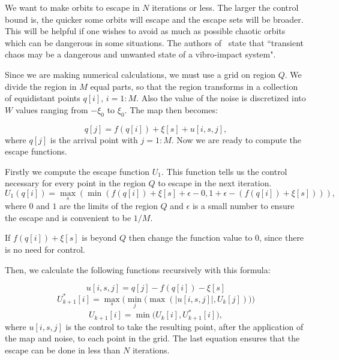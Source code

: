 We want to make orbits to escape in $N$ iterations or less. The larger the control bound is, the quicker some orbits will escape and the escape sets will be broader. This will be helpful if one wishes to avoid as much as possible chaotic orbits which can be dangerous in some situations. The authors of~\cite{AvoidTransient1} state that ``transient chaos may be a dangerous and unwanted state of a vibro-impact system". 

Since we are making numerical calculations, we must use a grid on region $Q$. We divide the region in $M$ equal parts, so that the region transforms in a collection of equidistant points $q[i]$, $i=1:M$. Also the value of the noise is discretized into $W$ values ranging from $-\xi_0$ to $\xi_0$. The map then becomes:

\begin{equation}
    q[j] = f(q[i]) +\xi[s] +u[i,s,j],
\end{equation}
where $q[j]$ is the arrival point with $j=1:M$. Now we are ready to compute the escape functions.

Firstly we compute the escape function $U_1$. This function tells us the control necessary for every point in the region $Q$ to escape in the next iteration. 
\begin{equation}
U_1(q[i]) = \max\limits_{s}(\min(f(q[i]) + \xi[s] + \epsilon - 0, 1 + \epsilon - (f(q[i]) + \xi[s]))),
\end{equation}
where $0$ and $1$ are the limits of the region $Q$ and $\epsilon$ is a small number to ensure the escape and is convenient to be $1/M$.

If $f(q[i]) + \xi[s]$ is beyond $Q$ then change the function value to $0$, since there is no need for control.

Then, we calculate the following functions recursively with this formula:

\begin{equation*}
u[i,s,j] = q[j] - f(q[i]) - \xi[s]
\end{equation*}
\begin{equation*}
U^{*}_{k+1}[i]=\max_s\Big(\min_j\big(\max(|u[i,s,j]|,U_k[j])\big)\Big)
\end{equation*}
\begin{equation}
U_{k+1}[i]=\min\bigg(U_k[i],U^{*}_{k+1}[i]\bigg),
\label{equ:QuickEscapeFunctions}
\end{equation}
where $u[i,s,j]$ is the control to take the resulting point, after the application of the map and noise, to each point in the grid. The last equation ensures that the escape can be done in less than $N$ iterations.

